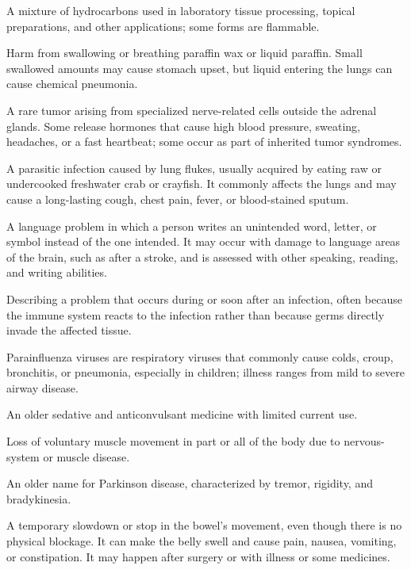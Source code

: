  A mixture of hydrocarbons used in laboratory tissue processing, topical preparations, and other applications; some forms are flammable.

 Harm from swallowing or breathing paraffin wax or liquid paraffin. Small swallowed amounts may cause stomach upset, but liquid entering the lungs can cause chemical pneumonia.

 A rare tumor arising from specialized nerve-related cells outside the adrenal glands. Some release hormones that cause high blood pressure, sweating, headaches, or a fast heartbeat; some occur as part of inherited tumor syndromes.

 A parasitic infection caused by lung flukes, usually acquired by eating raw or undercooked freshwater crab or crayfish. It commonly affects the lungs and may cause a long-lasting cough, chest pain, fever, or blood-stained sputum.

 A language problem in which a person writes an unintended word, letter, or symbol instead of the one intended. It may occur with damage to language areas of the brain, such as after a stroke, and is assessed with other speaking, reading, and writing abilities.

 Describing a problem that occurs during or soon after an infection, often because the immune system reacts to the infection rather than because germs directly invade the affected tissue.

 Parainfluenza viruses are respiratory viruses that commonly cause colds, croup, bronchitis, or pneumonia, especially in children; illness ranges from mild to severe airway disease.

 An older sedative and anticonvulsant medicine with limited current use.

 Loss of voluntary muscle movement in part or all of the body due to nervous-system or muscle disease.

 An older name for Parkinson disease, characterized by tremor, rigidity, and bradykinesia.

 A temporary slowdown or stop in the bowel’s movement, even though there is no physical blockage. It can make the belly swell and cause pain, nausea, vomiting, or constipation. It may happen after surgery or with illness or some medicines.


